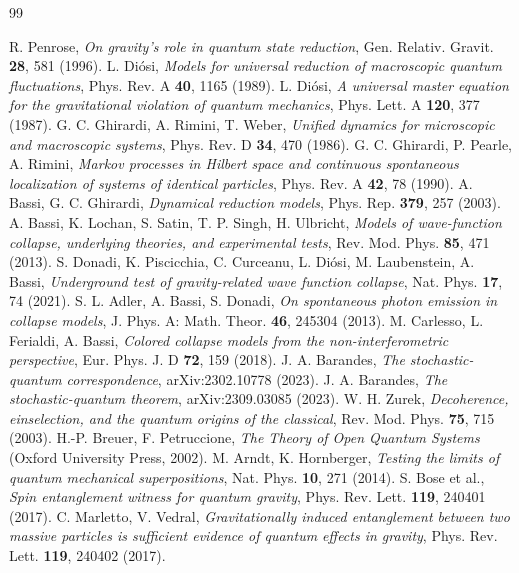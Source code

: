 \documentclass[aps,prd,onecolumn,amsmath,amssymb,nofootinbib,superscriptaddress]{revtex4-2}
\begin{document}
\begin{thebibliography}{99}

 R. Penrose, \emph{On gravity's role in quantum state reduction}, Gen. Relativ. Gravit. \textbf{28}, 581 (1996).
 L. Di\'osi, \emph{Models for universal reduction of macroscopic quantum fluctuations}, Phys. Rev. A \textbf{40}, 1165 (1989).
 L. Di\'osi, \emph{A universal master equation for the gravitational violation of quantum mechanics}, Phys. Lett. A \textbf{120}, 377 (1987).
 G. C. Ghirardi, A. Rimini, T. Weber, \emph{Unified dynamics for microscopic and macroscopic systems}, Phys. Rev. D \textbf{34}, 470 (1986).
 G. C. Ghirardi, P. Pearle, A. Rimini, \emph{Markov processes in Hilbert space and continuous spontaneous localization of systems of identical particles}, Phys. Rev. A \textbf{42}, 78 (1990).
 A. Bassi, G. C. Ghirardi, \emph{Dynamical reduction models}, Phys. Rep. \textbf{379}, 257 (2003).
 A. Bassi, K. Lochan, S. Satin, T. P. Singh, H. Ulbricht, \emph{Models of wave-function collapse, underlying theories, and experimental tests}, Rev. Mod. Phys. \textbf{85}, 471 (2013).
 S. Donadi, K. Piscicchia, C. Curceanu, L. Di\'osi, M. Laubenstein, A. Bassi, \emph{Underground test of gravity-related wave function collapse}, Nat. Phys. \textbf{17}, 74 (2021).
 S. L. Adler, A. Bassi, S. Donadi, \emph{On spontaneous photon emission in collapse models}, J. Phys. A: Math. Theor. \textbf{46}, 245304 (2013).
 M. Carlesso, L. Ferialdi, A. Bassi, \emph{Colored collapse models from the non-interferometric perspective}, Eur. Phys. J. D \textbf{72}, 159 (2018).
 J. A. Barandes, \emph{The stochastic-quantum correspondence}, arXiv:2302.10778 (2023).
 J. A. Barandes, \emph{The stochastic-quantum theorem}, arXiv:2309.03085 (2023).
 W. H. Zurek, \emph{Decoherence, einselection, and the quantum origins of the classical}, Rev. Mod. Phys. \textbf{75}, 715 (2003).
 H.-P. Breuer, F. Petruccione, \emph{The Theory of Open Quantum Systems} (Oxford University Press, 2002).
 M. Arndt, K. Hornberger, \emph{Testing the limits of quantum mechanical superpositions}, Nat. Phys. \textbf{10}, 271 (2014).
 S. Bose et al., \emph{Spin entanglement witness for quantum gravity}, Phys. Rev. Lett. \textbf{119}, 240401 (2017).
 C. Marletto, V. Vedral, \emph{Gravitationally induced entanglement between two massive particles is sufficient evidence of quantum effects in gravity}, Phys. Rev. Lett. \textbf{119}, 240402 (2017).

\end{thebibliography}
\end{document}

